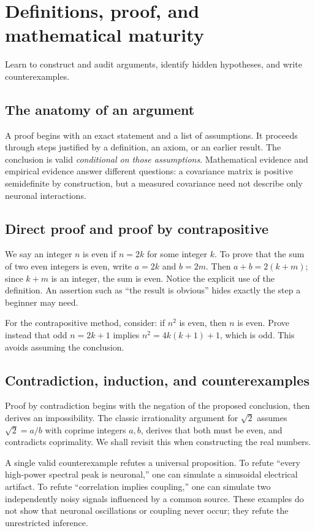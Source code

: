 \chapter{Definitions, proof, and mathematical maturity}\label{ch:proof}
\begin{readergoal}Learn to construct and audit arguments, identify hidden hypotheses, and write counterexamples.\end{readergoal}
\section{The anatomy of an argument}
A proof begins with an exact statement and a list of assumptions. It proceeds through steps justified by a definition, an axiom, or an earlier result. The conclusion is valid \emph{conditional on those assumptions}. Mathematical evidence and empirical evidence answer different questions: a covariance matrix is positive semidefinite by construction, but a measured covariance need not describe only neuronal interactions.

\section{Direct proof and proof by contrapositive}
We say an integer $n$ is even if $n=2k$ for some integer $k$. To prove that the sum of two even integers is even, write $a=2k$ and $b=2m$. Then $a+b=2(k+m)$; since $k+m$ is an integer, the sum is even. Notice the explicit use of the definition. An assertion such as ``the result is obvious'' hides exactly the step a beginner may need.

For the contrapositive method, consider: if $n^2$ is even, then $n$ is even. Prove instead that odd $n=2k+1$ implies $n^2=4k(k+1)+1$, which is odd. This avoids assuming the conclusion.

\section{Contradiction, induction, and counterexamples}
Proof by contradiction begins with the negation of the proposed conclusion, then derives an impossibility. The classic irrationality argument for $\sqrt2$ assumes $\sqrt2=a/b$ with coprime integers $a,b$, derives that both must be even, and contradicts coprimality. We shall revisit this when constructing the real numbers.

A single valid counterexample refutes a universal proposition. To refute ``every high-power spectral peak is neuronal,'' one can simulate a sinusoidal electrical artifact. To refute ``correlation implies coupling,'' one can simulate two independently noisy signals influenced by a common source. These examples do not show that neuronal oscillations or coupling never occur; they refute the unrestricted inference.


